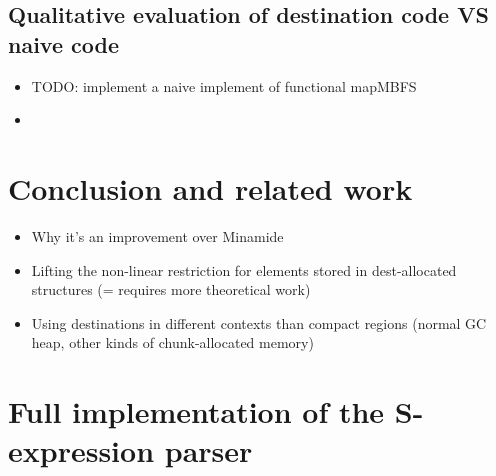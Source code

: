\documentclass[english]{jflart}
\begin{document}
\subsection{Qualitative evaluation of destination code VS naive code}

\begin{itemize}
\item TODO: implement a naive implement of functional mapMBFS
\item \end{itemize}

\section{Conclusion and related work}
\begin{itemize}
\item Why it's an improvement over Minamide

\item Lifting the non-linear restriction for elements stored in dest-allocated structures (= requires more theoretical work)

\item Using destinations in different contexts than compact regions (normal GC heap, other kinds of chunk-allocated memory)
\end{itemize}

\appendix

\section{Full implementation of the S-expression parser}\label{ann:parse-s-expr}
\end{document}
